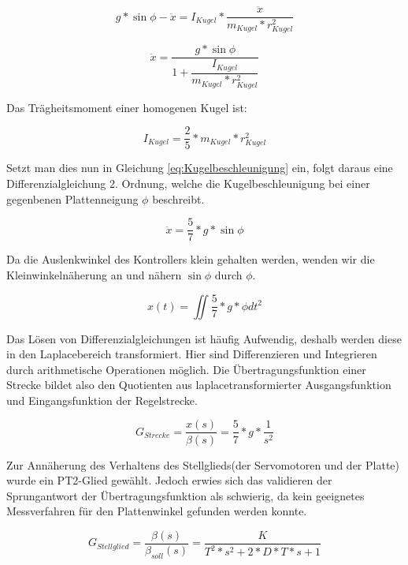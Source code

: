 \documentclass[12pt,a4paper,bibliography=totoc,listof=totoc]{scrartcl}
\begin{document}
\begin{equation} 
g * \sin\phi - \ddot{x} = I_{Kugel} * \frac{\ddot{x}}{m_{Kugel} * r_{Kugel}^2}
\end{equation}

\begin{equation} 
\ddot{x} =  \dfrac{g * \sin\phi }{1 + \dfrac{I_{Kugel}}{m_{Kugel} * r_{Kugel}^2}}
\label{eq:Kugelbeschleunigung}
\end{equation}

Das Trägheitsmoment einer homogenen Kugel ist:

\begin{equation} 
I_{Kugel} =  \frac{2}{5} * m_{Kugel} * r_{Kugel}^2
\end{equation}

Setzt man dies nun in Gleichung \ref{eq:Kugelbeschleunigung} ein, folgt daraus eine Differenzialgleichung 2. Ordnung, welche die Kugelbeschleunigung bei einer gegenbenen Plattenneigung \(\phi\) beschreibt.

\begin{equation} 
\ddot{x} =  \dfrac{5}{7}*g* \sin\phi
\end{equation}

Da die Auslenkwinkel des Kontrollers klein gehalten werden, wenden wir die Kleinwinkelnäherung an und nähern \(\sin\phi\) durch \(\phi\).

\begin{equation} 
x(t) =  \iint\dfrac{5}{7}*g* \phi dt^2
\end{equation}

Das Lösen von Differenzialgleichungen ist häufig Aufwendig, deshalb werden diese in den Laplacebereich transformiert. Hier sind Differenzieren und Integrieren durch arithmetische Operationen möglich. Die Übertragungsfunktion einer Strecke bildet also den Quotienten aus laplacetransformierter Ausgangsfunktion und Eingangsfunktion der Regelstrecke.

\begin{equation} 
G_{Strecke} =  \dfrac{x(s)}{\beta(s)} = \dfrac{5}{7} * g * \dfrac{1}{s^2}
\end{equation}

Zur Annäherung des Verhaltens des Stellglieds(der Servomotoren und der Platte) wurde ein PT2-Glied gewählt. Jedoch erwies sich das validieren der Sprungantwort der Übertragungsfunktion als schwierig, da kein geeignetes Messverfahren für den Plattenwinkel gefunden werden konnte.

\begin{equation} 
G_{Stellglied} =  \dfrac{\beta(s)}{\beta_{soll}(s)} = 
\dfrac{K}{T^2*s^2+2*D*T*s+1}
\end{equation}
\end{document}
